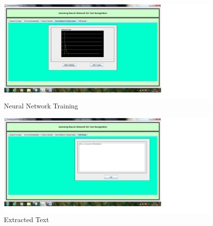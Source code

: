 \begin{figure}[h]
\begin{center}
\includegraphics[scale=0.5]{op4.jpg}
\end{center}
\caption{Neural Network Training}
\end{figure}


\begin{figure}[h]
\begin{center}
\includegraphics[scale=0.5]{op5.jpg}
\end{center}
\caption{Extracted Text}
\end{figure}
